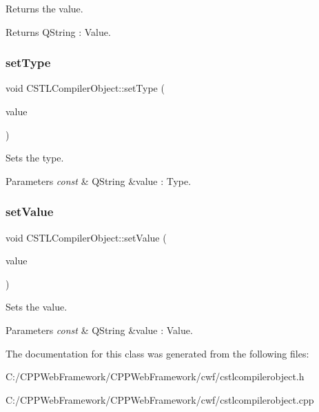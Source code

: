 Returns the value. 

\begin{DoxyReturn}{Returns}
Q\+String \+: Value. 
\end{DoxyReturn}
\mbox{\label{class_c_s_t_l_compiler_object_a16ec55cd3515f6d72c79c565bcad9243}} 
\subsubsection{\texorpdfstring{set\+Type}{setType}}
{\footnotesize\ttfamily void C\+S\+T\+L\+Compiler\+Object\+::set\+Type (\begin{DoxyParamCaption}\item[{const Q\+String \&}]{value }\end{DoxyParamCaption})\hspace{0.3cm}{\ttfamily [slot]}}



Sets the type. 


\begin{DoxyParams}{Parameters}
{\em const} & Q\+String \&value \+: Type. \\
\hline
\end{DoxyParams}
\mbox{\label{class_c_s_t_l_compiler_object_ab32dd59c381d9fbf7d2ce58226c4f93a}} 
\subsubsection{\texorpdfstring{set\+Value}{setValue}}
{\footnotesize\ttfamily void C\+S\+T\+L\+Compiler\+Object\+::set\+Value (\begin{DoxyParamCaption}\item[{const Q\+String \&}]{value }\end{DoxyParamCaption})\hspace{0.3cm}{\ttfamily [slot]}}



Sets the value. 


\begin{DoxyParams}{Parameters}
{\em const} & Q\+String \&value \+: Value. \\
\hline
\end{DoxyParams}


The documentation for this class was generated from the following files\+:\begin{DoxyCompactItemize}
\item 
C\+:/\+C\+P\+P\+Web\+Framework/\+C\+P\+P\+Web\+Framework/cwf/cstlcompilerobject.\+h\item 
C\+:/\+C\+P\+P\+Web\+Framework/\+C\+P\+P\+Web\+Framework/cwf/cstlcompilerobject.\+cpp\end{DoxyCompactItemize}
